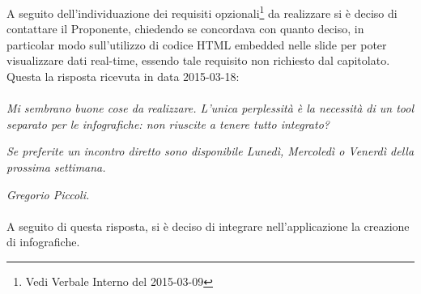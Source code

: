 A seguito dell'individuazione dei requisiti opzionali\footnote{Vedi \gls{Verbale} Interno del 2015-03-09} da realizzare si è deciso di contattare il Proponente, chiedendo se concordava con quanto deciso, in particolar modo sull'utilizzo di codice \gls{HTML} embedded nelle slide per poter visualizzare dati real-time, essendo tale requisito non richiesto dal capitolato. Questa la risposta ricevuta in data 2015-03-18:

\paragraph{}
\textit{Mi sembrano buone cose da realizzare. L'unica perplessità è la necessità di un tool separato per le infografiche: non riuscite a tenere tutto integrato?} 
	
\noindent \textit{Se preferite un incontro diretto sono disponibile Lunedì, Mercoledì o Venerdì della prossima settimana.}

\noindent \textit{Gregorio Piccoli.}

\paragraph{}
\noindent A seguito di questa risposta, si è deciso di integrare nell'applicazione la creazione di infografiche.

